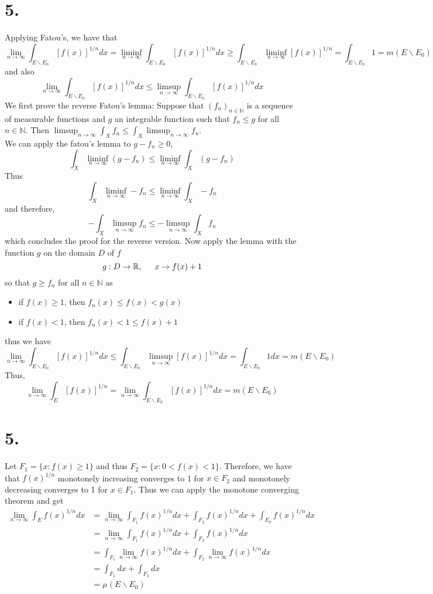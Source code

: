 \documentclass[11pt]{article}
\theoremstyle{mystyle}
\theoremstyle{definition}
\begin{document}
\section*{5.}
Applying Fatou's, we have that  
\[
  \lim_{n \to \infty} \int_{E\backslash E_0} [f(x)]^{1/n} dx = \liminf_{n \to \infty} \int_{E\backslash E_0} [f(x)]^{1/n} dx \ge \int_{E \backslash E_0} \liminf_{n \to \infty} [f(x)]^{1/n} = \int_{E\backslash E_0} 1 = m(E \backslash E_0)
\]
and also 
\[
  \lim_{n \to \infty} \int_{E\backslash E_0} [f(x)]^{1/n} dx \le \limsup_{n \to \infty} \int_{E\backslash E_0} [f(x)]^{1/n} dx 
\]
We first prove the reverse Fatou's lemma: Suppose that $(f_n)_{n\in \mathbb{N}}$ is a sequence of measurable functions and $g$ an integrable function such that $f_n \le g$ for all $n \in \mathbb{N}$. Then $\limsup_{n \to \infty} \int_{X} f_n \le \int_{X} \limsup_{n \to \infty} f_n$. \\
We can apply the fatou's lemma to $g-f_n \ge 0$, 
\[
  \int_X \liminf_{n \to \infty} (g-f_n) \le \liminf_{n \to \infty} \int_X (g-f_n)
\]
Thus 
\[
  \int_X \liminf_{n \to \infty} - f_n \le \liminf_{n \to \infty} \int_X -f_n
\]
and therefore, 
\[
  - \int_X \limsup_{n \to \infty} f_n \le -\limsup_{n \to \infty} \int_X f_n
\]
which concludes the proof for the reverse version. Now apply the lemma with the function $g$ on the domain $D$ of $f$ 
\[
  g: D \to \mathbb{R}, \indent x \to f(x) + 1
\]
so that $g \ge f_n$ for all $n \in \mathbb{N}$ as 
\begin{itemize}
  \item if $f(x) \ge 1$, then $f_n(x) \le f(x) < g(x)$  
  \item if $f(x) < 1$, then $f_n(x) < 1 \le f(x) + 1$ 
\end{itemize}
thus we have 
\[
  \lim_{n \to \infty} \int_{E \backslash E_0} [f(x)]^{1/n} dx \le \int_{E \backslash E_0} \limsup_{n \to \infty} [f(x)]^{1/n} dx = \int_{E \backslash E_0} 1 dx = m(E \backslash E_0) 
\]
Thus, 
\[
  \lim_{n \to \infty} \int_E [f(x)]^{1/n} = \lim_{n \to \infty} \int_{E \backslash E_0} [f(x)]^{1/n} dx = m(E \backslash E_0)
\]
\newpage
\section*{5.}
Let $F_1 = \{x: f(x) \ge 1\}$ and thus $F_2 = \{x: 0< f(x) < 1\}$. Therefore, we have that $f(x)^{1/n}$ monotonely increasing converges to 1 for $x \in F_2$ and monotonely decreasing converges to 1 for $x \in F_1$. Thus we can apply the monotone converging theorem and get 
\begin{align*}
  \lim_{n \to \infty} \int_E f(x)^{1/n} dx 
  &= \lim_{n \to \infty} \int_{F_1} f(x)^{1/n} dx + \int_{F_2} f(x)^{1/n} dx + \int_{E_0} f(x)^{1/n} dx  \\
  &= \lim_{n \to \infty} \int_{F_1} f(x)^{1/n} dx + \int_{F_2} f(x)^{1/n} dx \\
  &= \int_{F_1} \lim_{n \to \infty} f(x)^{1/n} dx + \int_{F_2} \lim_{n \to \infty} f(x)^{1/n} dx \\
  &= \int_{F_1} dx + \int_{F_2} dx \\
  &= \mu(E\backslash E_0)
\end{align*}
\end{document}
